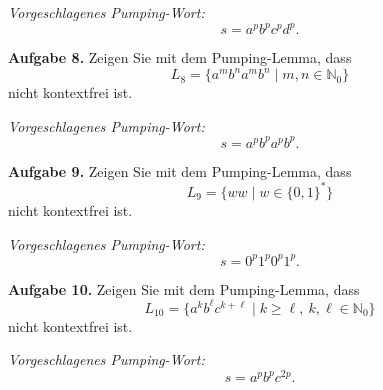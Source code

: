 \documentclass[a4paper,12pt]{article}
\begin{document}
\medskip
\textit{Vorgeschlagenes Pumping-Wort:}
\[
    s=a^p b^p c^p d^p.
\]

\medskip
\textbf{Aufgabe 8.}
Zeigen Sie mit dem Pumping-Lemma, dass
\[
    L_8=\{a^m b^n a^m b^n\mid m,n\in\mathbb{N}_0\}
\]
nicht kontextfrei ist.

\medskip
\textit{Vorgeschlagenes Pumping-Wort:}
\[
    s=a^p b^p a^p b^p.
\]

\medskip
\textbf{Aufgabe 9.}
Zeigen Sie mit dem Pumping-Lemma, dass
\[
    L_9=\{ww\mid w\in\{0,1\}^*\}
\]
nicht kontextfrei ist.

\medskip
\textit{Vorgeschlagenes Pumping-Wort:}
\[
    s=0^p1^p0^p1^p.
\]

\medskip
\textbf{Aufgabe 10.}
Zeigen Sie mit dem Pumping-Lemma, dass
\[
    L_{10}=\{a^k b^\ell c^{k+\ell}\mid k\ge \ell,\ k,\ell\in\mathbb{N}_0\}
\]
nicht kontextfrei ist.

\medskip
\textit{Vorgeschlagenes Pumping-Wort:}
\[
    s=a^p b^p c^{2p}.
\]
\end{document}
